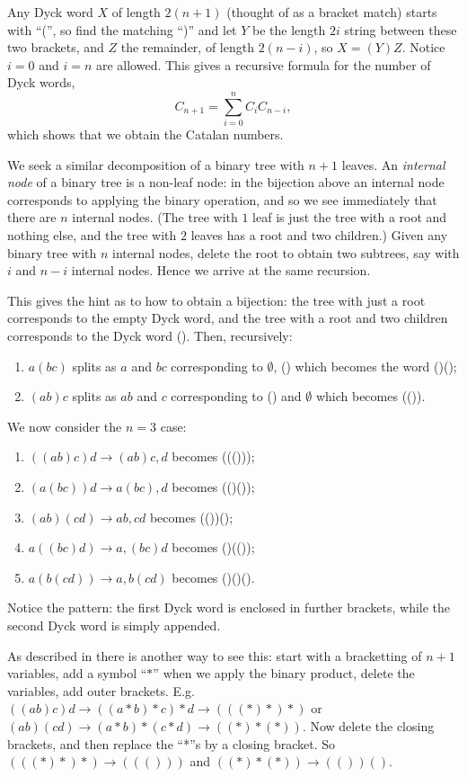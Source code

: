 \documentclass[twoside,a4paper,12pt]{article}
\theoremstyle{plain}
\theoremstyle{definition}
\begin{document}
Any Dyck word $X$ of length $2(n+1)$ (thought of as a bracket match) starts with ``('', so find the matching ``)'' and let $Y$ be the length $2i$ string between these two brackets, and $Z$ the remainder, of length $2(n-i)$, so $X = (Y)Z$.  Notice $i=0$ and $i=n$ are allowed.  This gives a recursive formula for the number of Dyck words,
\[ C_{n+1} = \sum_{i=0}^n C_i C_{n-i}, \]
which shows that we obtain the Catalan numbers.

We seek a similar decomposition of a binary tree with $n+1$ leaves.  An \emph{internal node} of a binary tree is a non-leaf node: in the bijection above an internal node corresponds to applying the binary operation, and so we see immediately that there are $n$ internal nodes.  (The tree with $1$ leaf is just the tree with a root and nothing else, and the tree with $2$ leaves has a root and two children.)  Given any binary tree with $n$ internal nodes, delete the root to obtain two subtrees, say with $i$ and $n-i$ internal nodes.  Hence we arrive at the same recursion.

This gives the hint as to how to obtain a bijection: the tree with just a root corresponds to the empty Dyck word, and the tree with a root and two children corresponds to the Dyck word ().  Then, recursively:
\begin{enumerate}
   \item $a(bc)$ splits as $a$ and $bc$ corresponding to $\emptyset$, () which becomes the word ()();
   \item $(ab)c$ splits as $ab$ and $c$ corresponding to () and $\emptyset$ which becomes (()).
\end{enumerate}
We now consider the $n=3$ case:
\begin{enumerate}
   \item $((ab)c)d \to (ab)c, d$ becomes ((()));
   \item $(a(bc))d \to a(bc), d$ becomes (()());
   \item $(ab)(cd) \to ab, cd$ becomes (())();
   \item $a((bc)d) \to a, (bc)d$ becomes ()(());
   \item $a(b(cd)) \to a, b(cd)$ becomes ()()().
\end{enumerate}
Notice the pattern: the first Dyck word is enclosed in further brackets, while the second Dyck word is simply appended.

As described in \cite{mvl} there is another way to see this: start with a bracketting of $n+1$ variables, add a symbol ``$*$'' when we apply the binary product, delete the variables, add outer brackets.  E.g.\@ $((ab)c)d \to ((a*b)*c)*d \to (((*)*)*)$ or $(ab)(cd) \to (a*b)*(c*d) \to ((*)*(*))$.  Now delete the closing brackets, and then replace the ``*''s by a closing bracket.  So $(((*)*)*) \to ((()))$ and $((*)*(*)) \to (())()$.
\end{document}
